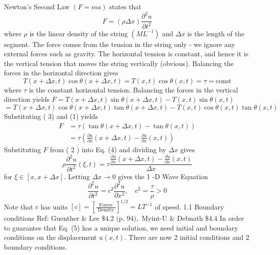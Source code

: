 \documentclass[a4paper,12pt]{amsart}
\begin{document}

\newpage

Newton's Second Law $(F=m a)$ states that
$$
F=(\rho \Delta x) \frac{\partial^{2} u}{\partial t^{2}}
$$
where $\rho$ is the linear density of the string $\left(M L^{-1}\right)$ and $\Delta x$ is the length of the segment. The force comes from the tension in the string only - we ignore any external forces such as gravity. The horizontal tension is constant, and hence it is the vertical tension that moves the string vertically (obvious). Balancing the forces in the horizontal direction gives
$$
T(x+\Delta x, t) \cos \theta(x+\Delta x, t)=T(x, t) \cos \theta(x, t)=\tau=\mathrm{const}
$$
where $\tau$ is the constant horizontal tension. Balancing the forces in the vertical direction yields
$F=T(x+\Delta x, t) \sin \theta(x+\Delta x, t)-T(x, t) \sin \theta(x, t)$
$=T(x+\Delta x, t) \cos \theta(x+\Delta x, t) \tan \theta(x+\Delta x, t)-T(x, t) \cos \theta(x, t) \tan \theta(x, t)$
Substituting ( 3) and (1) yields
$$
\begin{aligned}
F &=\tau(\tan \theta(x+\Delta x, t)-\tan \theta(x, t)) \\
&=\tau\left(\frac{\partial u}{\partial x}(x+\Delta x, t)-\frac{\partial u}{\partial x}(x, t)\right)
\end{aligned}
$$
Substituting $F$ from ( 2 ) into Eq. (4) and dividing by $\Delta x$ gives
$$
\rho \frac{\partial^{2} u}{\partial t^{2}}(\xi, t)=\tau \frac{\frac{\partial u}{\partial x}(x+\Delta x, t)-\frac{\partial u}{\partial x}(x, t)}{\Delta x}
$$
for $\xi \in[x, x+\Delta x] .$ Letting $\Delta x \rightarrow 0$ gives the 1 -D Wave Equation
$$
\frac{\partial^{2} u}{\partial t^{2}}=c^{2} \frac{\partial^{2} u}{\partial x^{2}}, \quad c^{2}=\frac{\tau}{\rho}>0
$$
Note that $c$ has units $[c]=\left[\frac{\text { Forree }}{\text { Density }}\right]^{1 / 2}=L T^{-1}$ of speed.
1.1 Boundary conditions
Ref: Guenther \& Lee $\$ 4.2 \text { (p. } 94),$ Myint-U \& Debnath $\$ 4.4$ In order to guarantee that Eq. (5) has a unique solution, we need initial and boundary conditions on the displacement $u(x, t) .$ There are now 2 initial conditions and 2 boundary conditions.


\newpage
\end{document}
